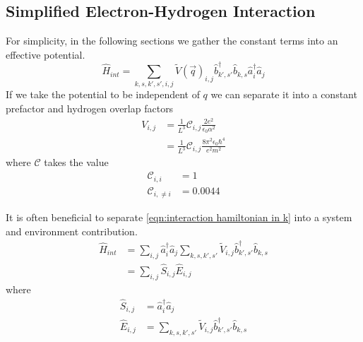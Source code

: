 \subsection{Simplified Electron-Hydrogen Interaction
}\label{sec:simplified interaction}
For simplicity, in the following sections
we gather the constant terms into
an effective potential.
\begin{equation}
    \hat{H}_{int} = \sum_{k,s,k',s',i,j}
    {\tilde{V}(\vec{q})}_{i,j}
    \hat{b}^\dagger_{k',s'}\hat{b}_{k,s}
    \hat{a}^\dagger_{i}\hat{a}_{j}
    \label{eqn:interaction hamiltonian in k}
\end{equation}
If we take the potential to be independent
of \(q\) we can separate it
into a constant prefactor
and hydrogen overlap factors
\begin{align}
    V_{i,j}
     & =
    \frac{1}{L^3}
    \mathcal{C}_{i,j}
    \frac{2e^2}{\epsilon_0 \alpha^2} \\
     & =
    \frac{1}{L^3}
    \mathcal{C}_{i,j}
    \frac{8 \pi^2 \epsilon_0 \hbar^4}{e^2 m^2}
    \label{eqn:simplified interacton potential}
\end{align}
where \(\mathcal{C}\) takes
the value
\begin{align}
    \mathcal{C}_{i, i}      & = 1      \\
    \mathcal{C}_{i, \neq i} & = 0.0044
\end{align}

It is often beneficial to separate
\cref{eqn:interaction hamiltonian in k}
into a system and environment contribution.
\begin{align}
    \hat{H}_{int} & =
    \sum_{i,j}
    \hat{a}^\dagger_{i}\hat{a}_{j}
    \sum_{k,s,k',s'}
    \tilde{V}_{i,j}
    \hat{b}^\dagger_{k',s'}\hat{b}_{k,s} \\
                  & = \sum_{i,j}
    \hat{S}_{i,j} \hat{E}_{i,j}\label{eqn:split interaction hamiltonian}
\end{align}
where
\begin{align}
    \hat{S}_{i,j} & = \hat{a}^\dagger_{i}\hat{a}_{j} \\
    \hat{E}_{i,j} & = \sum_{k,s,k',s'}
    \tilde{V}_{i,j}
    \hat{b}^\dagger_{k',s'}\hat{b}_{k,s}
\end{align}